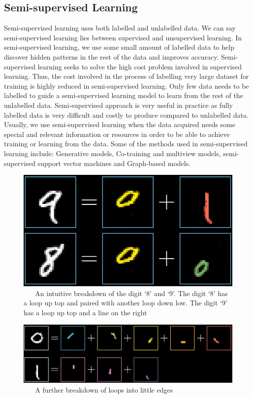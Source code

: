 \documentclass[master]{thesis-uestc}
\begin{document}
\subsection{Semi-supervised Learning}
Semi-supervised learning uses both labelled and unlabelled data. We can say semi-supervised learning lies between supervised and unsupervised learning. In semi-supervised learning, we use some small amount of labelled data to help discover hidden patterns in the rest of the data and improves accuracy. Semi-supervised learning seeks to solve the high cost problem involved in supervised learning. Thus, the cost involved in the process of labelling very large dataset for training is highly reduced in semi-supervised learning. Only few data needs to be labelled to guide a semi-supervised learning model to learn from the rest of the unlabelled data. Semi-supervised approach is very useful in practice as fully labelled data is very difficult and costly to produce compared to unlabelled data. Usually, we use semi-supervised learning when the data acquired needs some special and relevant information or resources in order to be able to achieve training or learning from the data. Some of the methods used in semi-supervised learning include: Generative models, Co-training and multiview models, semi-supervised support vector machines and Graph-based models.

\begin{figure}[ht]
\includegraphics[width=5in]{pic/digits.PNG}
\caption{\,\,\,\,\,\,\,\,\,\,An intuitive breakdown of the digit `8' and `9'. The digit `8' has a loop up top and paired with another loop down low. The digit `9' has a loop up top and a line on the right}
\label{fig_digit}
\end{figure}
\begin{figure}[ht]
\includegraphics[width=5in]{pic/digits_subcomponents.PNG}
\caption{\,\,\,\,\,\,\,\,\,\,A further breakdown of loops into little edges}
\label{fig_digit_sub}
\end{figure}
\end{document}
